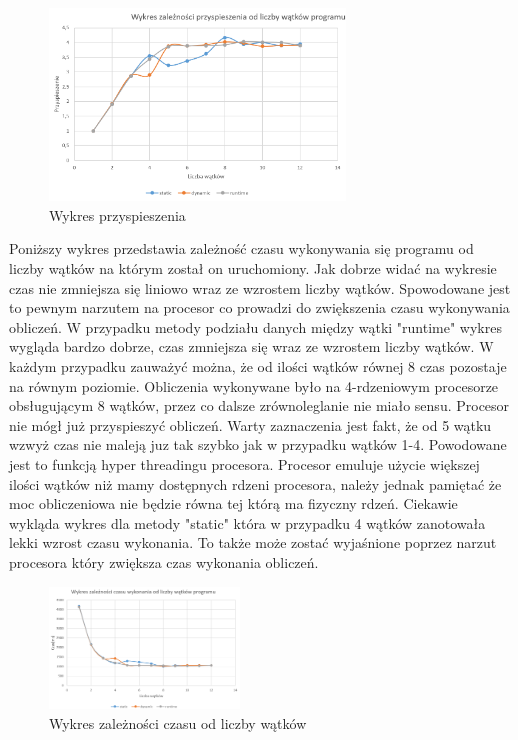 \documentclass[a4paper,12pt]{article}
\begin{document}
\begin{figure}[!hbp]
	\centering
  \includegraphics[width=0.7\textwidth]{wykres1.png}
  \caption{Wykres przyspieszenia}
\end{figure}
Poniższy wykres przedstawia zależność czasu wykonywania się programu od liczby wątków na którym został on uruchomiony. Jak dobrze widać na wykresie czas nie zmniejsza się liniowo wraz ze wzrostem liczby wątków. Spowodowane jest to pewnym narzutem na procesor co prowadzi do zwiększenia czasu wykonywania obliczeń. W przypadku metody podziału danych między wątki "runtime" wykres wygląda bardzo dobrze, czas zmniejsza się wraz ze wzrostem liczby wątków. W każdym przypadku zauważyć można, że od ilości wątków równej 8 czas pozostaje na równym poziomie. Obliczenia wykonywane było na 4-rdzeniowym procesorze obsługującym 8 wątków, przez co dalsze zrównoleglanie nie miało sensu. Procesor nie mógł już przyspieszyć obliczeń. Warty zaznaczenia jest fakt, że od 5 wątku wzwyż czas nie maleją juz tak szybko jak w przypadku wątków 1-4. Powodowane jest to funkcją hyper threadingu procesora. Procesor emuluje użycie większej ilości wątków niż mamy dostępnych rdzeni procesora, należy jednak pamiętać że moc obliczeniowa nie będzie równa tej którą ma fizyczny rdzeń. Ciekawie wykląda wykres dla metody "static" która w przypadku 4 wątków zanotowała lekki wzrost czasu wykonania. To także może zostać wyjaśnione poprzez narzut procesora który zwiększa czas wykonania obliczeń.

\begin{figure}
  \vspace{-20pt}
  \begin{center}
  \includegraphics[width=0.45\textwidth]{wykres.png}
  \end{center}
  \vspace{-20pt}
  \caption{Wykres zależności czasu od liczby wątków}
  \vspace{-10pt}
\end{figure}
\end{document}
